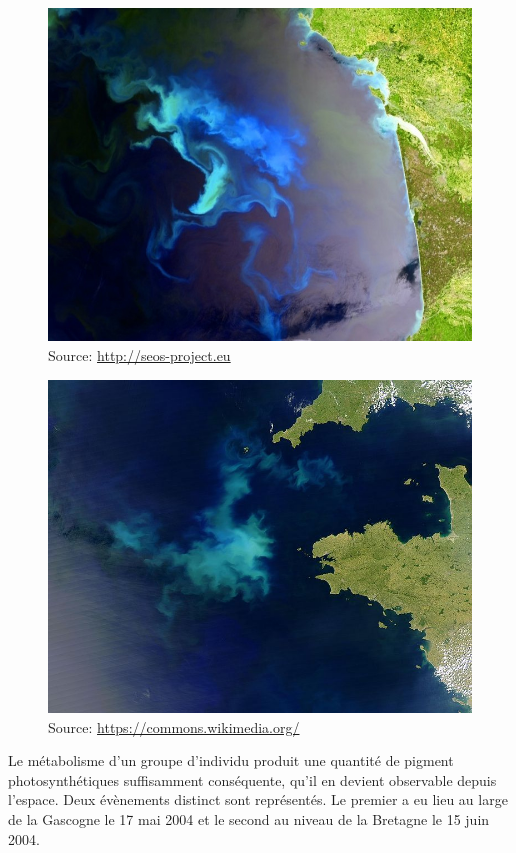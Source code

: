 \begin{refsection}
    
    \begin{shadedfigure}
        \begin{subfigure}[b]{.5\textwidth}
            \centering
            \includegraphics[width=\textwidth]{img/bloom_gascogne.jpg}
            \caption{{\tiny Source: \url{http://seos-project.eu}}}
            \label{fig:bloom_gascogne}
        \end{subfigure}
        \hfill
        \begin{subfigure}[b]{.5\textwidth}
            \centering
            \includegraphics[width=\textwidth]{img/bloom_bretagne.jpg}
            \caption{{\tiny Source: \url{https://commons.wikimedia.org/}}}
            \label{fig:bloom_bretagne}
        \end{subfigure}
    \caption{Le métabolisme d'un groupe d'individu produit une quantité de pigment photosynthétiques suffisamment conséquente, qu'il en devient observable depuis l'espace. Deux évènements distinct sont représentés. Le premier a eu lieu au large de la Gascogne le 17 mai 2004 et le second au niveau de la Bretagne le 15 juin 2004.}
    \label{fig:bloom}
    \end{shadedfigure}


\end{refsection}
